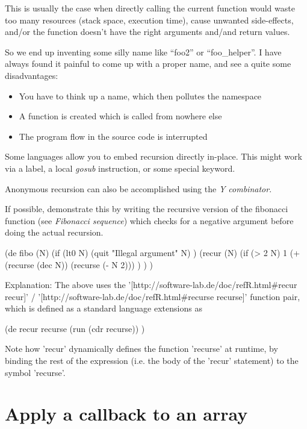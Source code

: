 This is usually the case when directly calling the current function
would waste too many resources (stack space, execution time), cause
unwanted side-effects, and/or the function doesn't have the right
arguments and/and return values.

So we end up inventing some silly name like ``foo2'' or ``foo\_helper''.
I have always found it painful to come up with a proper name, and see a
quite some disadvantages:

\begin{itemize}
\item
  You have to think up a name, which then pollutes the namespace
\item
  A function is created which is called from nowhere else
\item
  The program flow in the source code is interrupted
\end{itemize}

Some languages allow you to embed recursion directly in-place. This
might work via a label, a local \emph{gosub} instruction, or some
special keyword.

Anonymous recursion can also be accomplished using the
\emph{Y combinator}.

If possible, demonstrate this by writing the recursive version of the
fibonacci function (see \emph{Fibonacci sequence}) which checks for a
negative argument before doing the actual recursion.



\begin{wideverbatim}

(de fibo (N)
   (if (lt0 N)
      (quit "Illegal argument" N) )
   (recur (N)
      (if (> 2 N)
         1
         (+ (recurse (dec N)) (recurse (- N 2))) ) ) )

Explanation: The above uses the
'[http://software-lab.de/doc/refR.html#recur recur]' /
'[http://software-lab.de/doc/refR.html#recurse recurse]' function pair, which is
defined as a standard language extensions as

(de recur recurse
   (run (cdr recurse)) )

Note how 'recur' dynamically defines the function 'recurse' at runtime, by
binding the rest of the expression (i.e. the body of the 'recur' statement) to
the symbol 'recurse'.

\end{wideverbatim}

\pagebreak{}
\section*{Apply a callback to an array}


